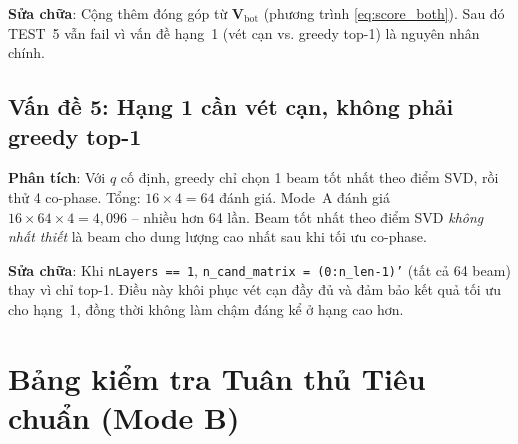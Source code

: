 \documentclass[11pt,a4paper]{article}
\begin{document}
\noindent\textbf{Sửa chữa}: Cộng thêm đóng góp từ $\mathbf{V}_\text{bot}$
(phương trình \eqref{eq:score_both}). Sau đó TEST~5 vẫn fail vì vấn đề
hạng~1 (vét cạn vs. greedy top-1) là nguyên nhân chính.

\subsection{Vấn đề 5: Hạng 1 cần vét cạn, không phải greedy top-1}

\noindent\textbf{Phân tích}: Với $q$ cố định, greedy chỉ chọn 1 beam tốt nhất
theo điểm SVD, rồi thử 4 co-phase. Tổng: $16 \times 4 = 64$ đánh giá.
Mode~A đánh giá $16 \times 64 \times 4 = 4{,}096$ -- nhiều hơn 64 lần.
Beam tốt nhất theo điểm SVD \emph{không nhất thiết} là beam cho dung lượng
cao nhất sau khi tối ưu co-phase.

\noindent\textbf{Sửa chữa}: Khi \texttt{nLayers == 1},
\texttt{n\_cand\_matrix = (0:n\_len-1)'} (tất cả 64 beam) thay vì chỉ top-1.
Điều này khôi phục vét cạn đầy đủ và đảm bảo kết quả tối ưu cho hạng~1,
đồng thời không làm chậm đáng kể ở hạng cao hơn.

\section{Bảng kiểm tra Tuân thủ Tiêu chuẩn (Mode B)}
\end{document}
